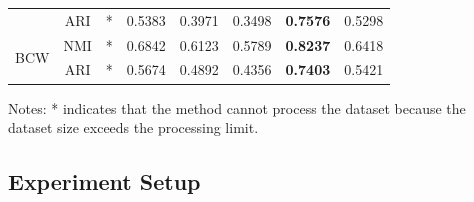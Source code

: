 \documentclass[journal]{IEEEtran}
\theoremstyle{definition}
\theoremstyle{remark} %
\begin{document}
\begin{table}[htbp]
\begin{threeparttable}
\begin{tabular}{@{} l c cccccc @{}}
                                        & ARI                     & *                                               & 0.5383                                        & 0.3971                                          & 0.3498                                   & \textbf{0.7576}        & 0.5298                   \\
            \multirow{2}{*}{BCW}        & NMI                     & *                                               & 0.6842                                        & 0.6123                                          & 0.5789                                   & \textbf{0.8237}        & 0.6418                   \\
                                        & ARI                     & *                                               & 0.5674                                        & 0.4892                                          & 0.4356                                   & \textbf{0.7403}        & 0.5421                   \\
            \bottomrule
        \end{tabular}
        \begin{tablenotes}
            \small
            \item Notes: * indicates that the method cannot process the dataset because the dataset size exceeds the processing limit.
        \end{tablenotes}
    \end{threeparttable}
\end{table}


\subsection{Experiment Setup}
\end{document}
